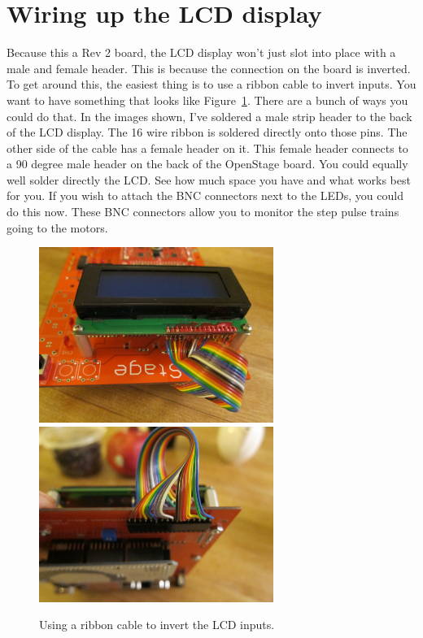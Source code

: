 \documentclass[11pt]{report} %
\begin{document}
\section{Wiring up the LCD display}
Because this a Rev 2 board, the LCD display won't just slot into place with a male and female header. This is because the connection on the board is inverted. To get around this, the easiest thing is to use a ribbon cable to invert inputs. You want to have something that looks like Figure~\ref{ribbon}. There are a bunch of ways you could do that. In the images shown, I've soldered a male strip header to the back of the LCD display. The 16 wire ribbon is soldered directly onto those pins. The other side of the cable has a female header on it. This female header connects to a 90 degree male header on the back of the OpenStage board. You could equally well solder directly the LCD. See how much space you have and what works best for you. If you wish to attach the BNC connectors next to the LEDs, you could do this now. These BNC connectors allow you to monitor the step pulse trains going to the motors.

\begin{figure}[!ht]
\centering
\includegraphics[width=3in]{IMG_3230.JPG}
\includegraphics[width=3in]{IMG_3231.JPG}
\caption{Using a ribbon cable to invert the LCD inputs.}
\label{ribbon}
\end{figure}
\end{document}
